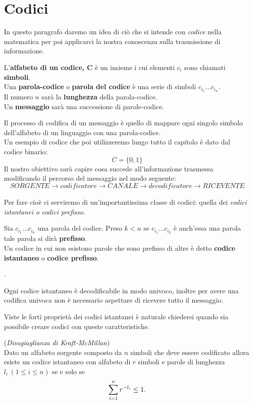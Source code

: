 \section{Codici}
\label{sec:Codici}
In questo paragrafo daremo un idea di ciò che si intende con \textit{codice} nella matematica per poi applicarci la nostra conoscenza sulla trasmissione di informazione.\\
\begin{defi}
L'\textbf{alfabeto di un codice, C} è un insieme \acode i cui elementi $c_i$ sono chiamati \textbf{simboli}.\\
Una \textbf{parola-codice} o \textbf{parola del codice} è una serie di simboli $c_{i_1}...c_{i_n}$.\\
Il numero $n$ sarà la \textbf{lunghezza} della parola-codice.\\
Un \textbf{messaggio} sarà una successione di parole-codice.
\end{defi}
Il processo di codifica di un messaggio è quello di mappare ogni singolo  simbolo dell'alfabeto di un linguaggio con una parola-codice.\\
Un esempio di codice che poi utilizzeremo lungo tutto il capitolo è dato dal codice binario:
$$C=\{0, 1 \}$$
Il nostro obiettivo sarà capire cosa succede all'informazione trasmessa modificando il percorso del messaggio nel modo seguente:
$$ SORGENTE \to codificatore \to CANALE \to decodificatore \to RICEVENTE$$
\\
Per fare cioè ci serviremo di un'importantissima classe di codici: quella dei \textit{codici istantanei o codici prefisso}.
\begin{defi}
Sia $c_{i_1}...c_{i_n}$ una parola del codice. Preso $k<n$ se  $c_{i_1}...c_{i_k}$
è anch'essa una parola tale parola si dirà \textbf{prefisso}.\\
Un codice in cui non esistono parole che sono prefisso di altre è detto \textbf{codice istantaneo} o \textbf{codice prefisso}.
\end{defi}.
\begin{lem}
Ogni codice istantaneo è decodificabile in modo univoco, inoltre per avere una codifica univoca non è necessario aspettare di ricevere tutto il messaggio.
\end{lem}

Viste le forti proprietà dei codici istantanei è naturale chiedersi quando sia possibile creare codici con queste caratteristiche.

\begin{teo} \label{teo:disugKM} (\textit{Disugiaglianza di Kraft-McMillan})\\
Dato un alfabeto sorgente composto da $n$ simboli che deve essere codificato allora esiste un codice istantaneo con alfabeto di $r$ simboli e parole di lunghezza $l_i \ (1 \leq i \leq n)$ se e solo se 
\begin{equation} \label{eq:disugKM}
\sum_{i=1}^n r^{-l_i}\leq 1.
\end{equation} 
\end{teo}

